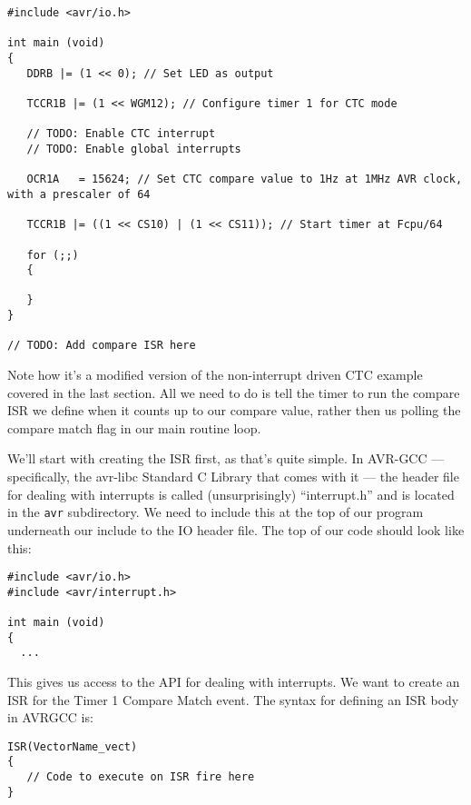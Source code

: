 \documentclass[a4paper,oneside,notitlepage]{book}
\begin{document}
\begin{center}
\begin{lstlisting}
#include <avr/io.h>

int main (void)
{
   DDRB |= (1 << 0); // Set LED as output

   TCCR1B |= (1 << WGM12); // Configure timer 1 for CTC mode

   // TODO: Enable CTC interrupt
   // TODO: Enable global interrupts

   OCR1A   = 15624; // Set CTC compare value to 1Hz at 1MHz AVR clock, with a prescaler of 64

   TCCR1B |= ((1 << CS10) | (1 << CS11)); // Start timer at Fcpu/64

   for (;;)
   {

   }
}

// TODO: Add compare ISR here 
\end{lstlisting}
\end{center}

Note how it's a modified version of the non-interrupt driven CTC example covered in the last section. All we need to do is tell the timer to run the compare ISR we define when it counts up to our compare value, rather then us polling the compare match flag in our main routine loop.

We'll start with creating the ISR first, as that's quite simple. In AVR-GCC --- specifically, the avr-libc Standard C Library that comes with it --- the header file for dealing with interrupts is called (unsurprisingly) ``interrupt.h'' and is located in the \texttt{avr} subdirectory. We need to include this at the top of our program underneath our include to the IO header file. The top of our code should look like this:

\begin{center}
\begin{lstlisting}
#include <avr/io.h>
#include <avr/interrupt.h>

int main (void)
{
  ...
\end{lstlisting}
\end{center}

This gives us access to the API for dealing with interrupts. We want to create an ISR for the Timer 1 Compare Match event. The syntax for defining an ISR body in AVRGCC is:

\begin{center}
\begin{lstlisting}
ISR(VectorName_vect)
{
   // Code to execute on ISR fire here
} 
\end{lstlisting}
\end{center}
\end{document}
